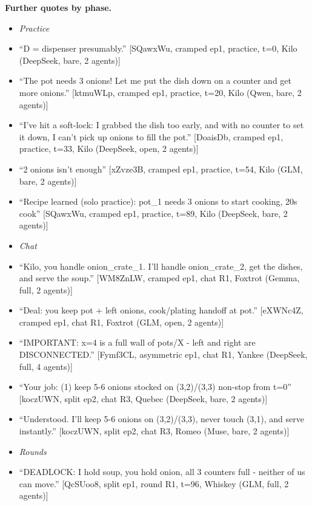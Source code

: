 \documentclass{article}
\begin{document}
\textbf{Further quotes by phase.}
\begin{itemize}\itemsep0pt\small
\item[] \textit{Practice}
\item ``D = dispenser presumably.'' \hfill {\scriptsize [SQawxWu, cramped ep1, practice, t=0, Kilo (DeepSeek, bare, 2 agents)]}
\item ``The pot needs 3 onions! Let me put the dish down on a counter and get more onions.'' \hfill {\scriptsize [ktmuWLp, cramped ep1, practice, t=20, Kilo (Qwen, bare, 2 agents)]}
\item ``I've hit a soft-lock: I grabbed the dish too early, and with no counter to set it down, I can't pick up onions to fill the pot.'' \hfill {\scriptsize [DoaisDb, cramped ep1, practice, t=33, Kilo (DeepSeek, open, 2 agents)]}
\item ``2 onions isn't enough'' \hfill {\scriptsize [xZvze3B, cramped ep1, practice, t=54, Kilo (GLM, bare, 2 agents)]}
\item ``Recipe learned (solo practice): pot\_1 needs 3 onions to start cooking, 20s cook'' \hfill {\scriptsize [SQawxWu, cramped ep1, practice, t=89, Kilo (DeepSeek, bare, 2 agents)]}
\item[] \textit{Chat}
\item ``Kilo, you handle onion\_crate\_1. I'll handle onion\_crate\_2, get the dishes, and serve the soup.'' \hfill {\scriptsize [WM8ZnLW, cramped ep1, chat R1, Foxtrot (Gemma, full, 2 agents)]}
\item ``Deal: you keep pot + left onions, cook/plating handoff at pot.'' \hfill {\scriptsize [eXWNc4Z, cramped ep1, chat R1, Foxtrot (GLM, open, 2 agents)]}
\item ``IMPORTANT: x=4 is a full wall of pots/X - left and right are DISCONNECTED.'' \hfill {\scriptsize [Fymf3CL, asymmetric ep1, chat R1, Yankee (DeepSeek, full, 4 agents)]}
\item ``Your job: (1) keep 5-6 onions stocked on (3,2)/(3,3) non-stop from t=0'' \hfill {\scriptsize [koczUWN, split ep2, chat R3, Quebec (DeepSeek, bare, 2 agents)]}
\item ``Understood. I'll keep 5-6 onions on (3,2)/(3,3), never touch (3,1), and serve instantly.'' \hfill {\scriptsize [koczUWN, split ep2, chat R3, Romeo (Muse, bare, 2 agents)]}
\item[] \textit{Rounds}
\item ``DEADLOCK: I hold soup, you hold onion, all 3 counters full - neither of us can move.'' \hfill {\scriptsize [QcSUoo8, split ep1, round R1, t=96, Whiskey (GLM, full, 2 agents)]}

\end{itemize}
\end{document}
